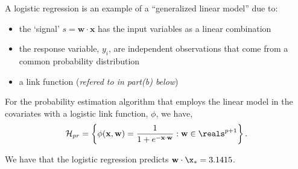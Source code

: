 \documentclass[12pt]{article}
\begin{document}

\begin{enumerate}

\begin{tcolorbox}[colback=white, sharp corners]

A logistic regression is an example of a ``generalized linear model'' due to: 
\begin{itemize}
\item the `signal' $s = \mathbf{w} \cdot \mathbf{x}$ has the input variables as a linear combination
\item the response variable, $y_i$, are independent observations that come from a common probability distribution
\item a link function (\textit{refered to in part(b) below})
\end{itemize}

\end{tcolorbox}


\begin{tcolorbox}[colback=white, sharp corners]
For the probability estimation algorithm that employs the linear model in the covariates with a logistic link function, $\phi$, we have,
\[
	\mathcal{H}_{pr} = \left\lbrace \phi(\mathbf{x}, \mathbf{w}) =  \dfrac{1}{1 + e^{-\mathbf{x} \cdot \mathbf{w}}}: \mathbf{w} \in \reals^{p+1} \right\rbrace.
\]
\end{tcolorbox}


\begin{tcolorbox}[colback=white, sharp corners]
 We have that the logistic regression predicts $\mathbf{w} \cdot \x_* = 3.1415$. 


\end{tcolorbox}
\end{enumerate}
\end{document}
